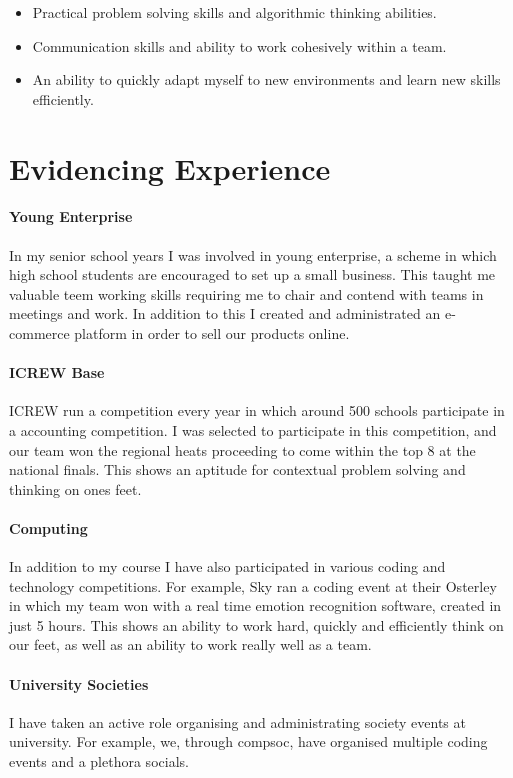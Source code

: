 \documentclass[9pt,a4paper]{article}
\begin{document}
\begin{multicols*}{2}
\begin{itemize}
\item Practical problem solving skills and algorithmic thinking abilities.

\item Communication skills and ability to work cohesively within a team.

\item An ability to quickly adapt myself to new environments and learn new skills efficiently.
\end{itemize}

\section*{Evidencing Experience}
\paragraph{Young Enterprise}
In my senior school years I was involved in young enterprise, a scheme in which high school students are encouraged to set up a small business.
This taught me valuable teem working skills requiring me to chair and contend with teams in meetings and work.
In addition to this I created and administrated an e-commerce platform in order to sell our products online.

\paragraph{ICREW Base}
ICREW run a competition every year in which around 500 schools participate in a accounting competition.
I was selected to participate in this competition, and our team won the regional heats proceeding to come within the top 8 at the national finals.
This shows an aptitude for contextual problem solving and thinking on ones feet.

\paragraph{Computing}
In addition to my course I have also participated in various coding and technology competitions.
For example, Sky ran a coding event at their Osterley in which my team won with a real time emotion recognition software, created in just 5 hours.
This shows an ability to work hard, quickly and efficiently think on our feet, as well as an ability to work really well as a team.

\paragraph{University Societies}
I have taken an active role organising and administrating society events at university.
For example, we, through compsoc, have organised multiple coding events and a plethora socials.


\end{multicols*}
\end{document}
